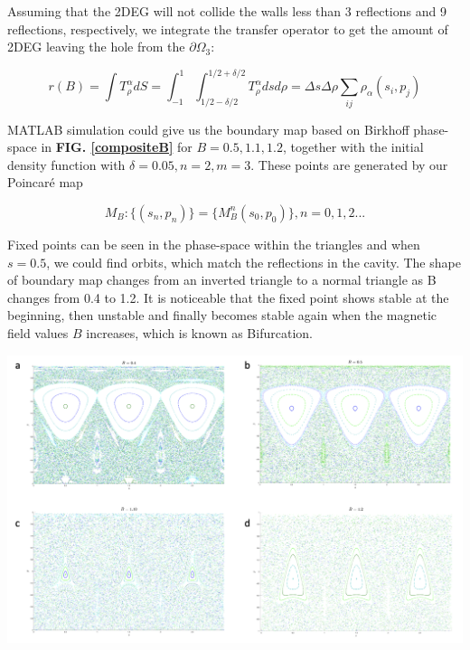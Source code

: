 \documentclass[a0,portrait]{a0poster}
\begin{document}
\begin{multicols}{3}
Assuming that the 2DEG will not collide the walls less than 3 reflections and 9 reflections, respectively, we integrate the transfer operator to get the amount of 2DEG leaving the hole from the $\partial \Omega_3$:

\begin{equation}
r(B)=\int T^{\alpha}_{\rho} dS=\int_{-1}^{1}\int_{1/2-\delta/2}^{1/2+\delta/2} T^{\alpha}_{\rho} dsd\rho=\Delta s \Delta \rho \sum_{ij} \rho_{\alpha}(s_i,p_j)
\end{equation}

MATLAB simulation could give us the boundary map based on Birkhoff phase-space in \textbf{FIG. \ref{compositeB}} for $B=0.5, 1.1, 1.2$, together with the initial density function with $\delta=0.05, n=2, m=3$. These points are generated by our Poincaré map

\begin{equation}
M_B: \{(s_n,p_n)\}=\{M^n_B(s_0,p_0)\}, n=0,1,2...   
\end{equation}

Fixed points can be seen in the phase-space within the triangles and when $s=0.5$, we could find orbits, which match the reflections in the cavity. The shape of boundary map changes from an inverted triangle to a normal triangle as B changes from 0.4 to 1.2. It is noticeable that the fixed point shows stable at the beginning, then unstable and finally becomes stable again when the magnetic field values $B$ increases, which is known as Bifurcation. 

\begin{center}\vspace{1cm}
\includegraphics[width=0.85\linewidth]{compositeB.png}
\label{compositeB}
\end{center}%


\end{multicols}
\end{document}
